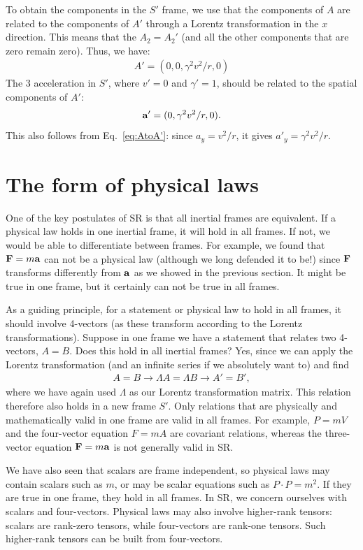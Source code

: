 \documentclass[12pt]{article}
\newcommand{\be}{\begin{eqnarray}}
\newcommand{\ee}{\end{eqnarray}}
\begin{document}
To obtain the components in the $S'$ frame, we use that the components of $A$ are related to the components of $A'$ through a Lorentz transformation in the $x$ direction. This means that the $A_2 = A_2'$ (and all the other components that are zero remain zero). Thus, we have:
\be
A' = (0,0,\gamma^2 v^2/r,0)
\ee
The 3 acceleration in $S'$, where $v'=0$ and $\gamma' = 1$, should be related to the spatial components of $A'$:
\be
{\bf a}' = (0,\gamma^2 v^2/r,0).
\ee
This also follows from Eq.~\eqref{eq:AtoA'}: since $a_y=v^2/r$, it gives
$a'_y=\gamma^2v^2/r$.

\section{The form of physical laws}\label{sec:physics}

One of the key postulates of SR is that all inertial frames are equivalent. If a physical law holds in one inertial frame, it will hold in all frames. If not, we would be able to differentiate between frames. For example, we found that ${\bf F} = m{\bf a}$ can not be a physical law (although we long defended it to be!) since ${\bf F}$ transforms differently from ${\bf a}$ as we showed in the previous section. It might be true in one frame, but it certainly can not be true in all frames. 

As a guiding principle, for a statement or physical law to hold in all frames, it should involve 4-vectors (as these transform according to the Lorentz transformations). Suppose in one frame we have a statement that relates two 4-vectors, $A = B$. Does this hold in all inertial frames? Yes, since we can apply the Lorentz transformation (and an infinite series if we absolutely want to) and find 
\be
A = B \rightarrow \Lambda A = \Lambda B \rightarrow A'  = B', 
\ee
where we have again used $\Lambda$ as our Lorentz transformation matrix. This relation therefore also holds in a new frame $S'$. Only relations that are physically and mathematically valid in one frame are valid in all frames. For example, $P=mV$ and the four-vector equation $F=mA$ are covariant relations, whereas the three-vector equation ${\bf F}=m{\bf a}$ is not generally valid in SR.

We have also seen that scalars are frame independent, so physical laws may contain scalars such as $m$, or may be scalar equations such as $P\cdot P=m^2$. If they are true in one frame, they hold in all frames. In SR, we concern ourselves with scalars and four-vectors. Physical laws may also involve higher-rank tensors: scalars are rank-zero tensors, while four-vectors are rank-one tensors. Such higher-rank tensors can be built from four-vectors.
\end{document}
